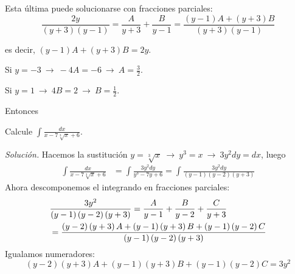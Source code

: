 Esta última puede solucionarse con fracciones parciales:
{\small
\[
\frac{2y}{\left( y+3\right) \left( y-1\right) }=\frac{A}{y+3}+\frac{B}{y-1}=%
\frac{\left( y-1\right) A+\left( y+3\right) B}{\left( y+3\right) \left(
y-1\right) }
\]
}

es decir, {\small$\left( y-1\right) A+\left( y+3\right) B=2y$.}

Si $y=-3\ \rightarrow\ -4A=-6\ \rightarrow\ A=\frac{3}{2}$.

Si $y=1\ \rightarrow\ 4B=2\ \rightarrow\ B=\frac{1}{2}$.

Entonces




\begin{ejemplo}
Calcule $\displaystyle{\int \frac{dx}{x-7\sqrt[3]{x}+6}}$.
\end{ejemplo}
\textit{Solución.} Hacemos la sustitución $y=\sqrt[3]{x}\ \rightarrow\ y^{3}=x\ \rightarrow\ 3y^{2}dy=dx$, luego
\begin{align*}
\int \frac{dx}{x-7\sqrt[3]{x}+6}&=\int \frac{3y^{2}dy}{y^{3}-7y+6}=\int
\frac{3y^{2}dy}{\left( y-1\right) \left( y-2\right) \left( y+3\right) }
\end{align*}
Ahora descomponemos el integrando en fracciones parciales:
{\small
\begin{align*}
&\frac{3y^{2}}{\left( y-1\right) \left( y-2\right) \left( y+3\right) }=\frac{%
A}{y-1}+\frac{B}{y-2}+\frac{C}{y+3} \\
&=\frac{\left( y-2\right) \left(
y+3\right) A+\left( y-1\right) \left( y+3\right) B+\left( y-1\right) \left(
y-2\right) C}{\left( y-1\right) \left( y-2\right) \left( y+3\right) }
\end{align*}
}
Igualamos numeradores:
\[
\left( y-2\right) \left( y+3\right) A+\left( y-1\right) \left( y+3\right)
B+\left( y-1\right) \left( y-2\right) C=3y^{2}
\]

